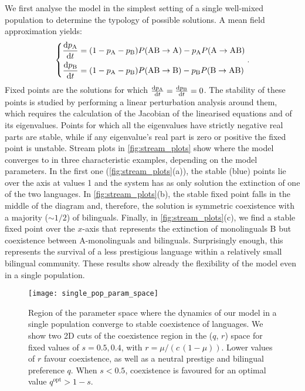 \documentclass[../thesis.tex]{subfiles}
\begin{document}
We first analyse the model
in the simplest setting of a single well-mixed population to
determine the typology of possible solutions. A mean field approximation yields:
\begin{equation}
  \label{eq:dt_bipref_model}
  \left\{
  \begin{aligned}
    \dv{p_\text{A}}{t} &= (1 - p_\text{A} - p_\text{B}) P (\text{AB} \rightarrow \text{A})
        - p_\text{A} P (\text{A} \rightarrow \text{AB})
    \\
    \dv{p_\text{B}}{t} &= (1 - p_\text{A} - p_\text{B}) P (\text{AB} \rightarrow \text{B})
        - p_\text{B} P (\text{B} \rightarrow \text{AB})
  \end{aligned}
    \right. .
\end{equation}
Fixed points are the solutions for which $\dv{p_\text{A}}{t} = \dv{p_\text{B}}{t} = 0$.
The stability of these points is studied by performing a linear perturbation analysis
around them, which requires the calculation of the Jacobian of the linearised equations
and of its eigenvalues. Points for which all the eigenvalues have strictly negative real
parts are stable, while if any eigenvalue's real part is zero or positive the fixed
point is unstable. Stream plots in \cref{fig:stream_plots} show where the model
converges to in three characteristic examples, depending on the model parameters. In the
first one (\cref{fig:stream_plots}(a)), the stable (blue) points lie over the axis at
values 1 and the system has as only solution the extinction of one of the two languages.
In \cref{fig:stream_plots}(b), the stable fixed point falls in the middle of the diagram
and, therefore, the solution is symmetric coexistence with a majority ($\sim 1/2$) of
bilinguals. Finally, in \cref{fig:stream_plots}(c), we find a stable fixed point over
the $x$-axis that represents the extinction of monolinguals B but coexistence between
A-monolinguals and bilinguals. Surprisingly enough, this represents the survival of a
less prestigious language within a relatively small bilingual community. These results
show already the flexibility of the model even in a single population.

\begin{figure}[h]
  \centering
  \texttt{[image: single\_pop\_param\_space]}
  \caption{Region of the parameter space where the dynamics of our model in a single
  population converge to stable coexistence of languages. We show two 2D cuts of the
  coexistence region in the ($q$, $r$) space for fixed values of $s=0.5, 0.4$, with $r
  = \mu / (c \, (1-\mu))$. Lower values of $r$ favour coexistence, as well as a
  neutral prestige and bilingual preference $q$. When $s < 0.5$, coexistence is
  favoured for an optimal value $q^\text{opt} > 1-s$.}
  \label{fig:coex_region}
\end{figure}
\end{document}
